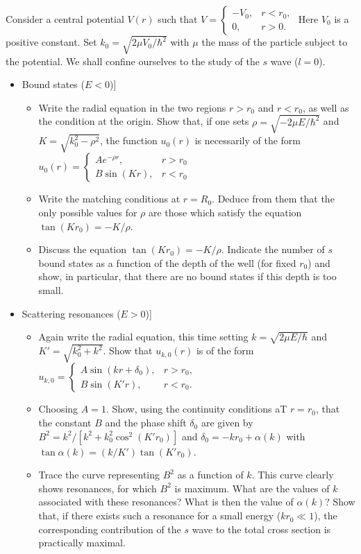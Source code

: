 \documentclass[10pt,a4paper]{article}
\newenvironment{problem}[2][Problem]{\begin{trivlist}
\item[\hskip \labelsep {\bfseries #1}\hskip \labelsep {\bfseries #2.}]}{\end{trivlist}}
\begin{document}
\begin{problem}{4}
[C-T Complement C$_\text{VIII}$-3 Exercise b] Consider a central potential $V(r)$ such that $V=\left\{\begin{array}{ll}-V_0,&r<r_0,\\0,&r>0.\end{array}\right.$ Here $V_0$ is a positive constant. Set $k_0=\sqrt{2\mu V_0/\hbar^2}$ with $\mu$ the mass of the particle subject to the potential. We shall confine ourselves to the study of the $s$ wave ($l=0$).
\begin{itemize}
\item[(a)] Bound states ($E<0$)]
\begin{itemize}
\item[i.] Write the radial equation in the two regions $r>r_0$ and $r<r_0$, as well as the condition at the origin. Show that, if one sets $\rho=\sqrt{-2\mu E/\hbar^2}$ and $K=\sqrt{k_0^2-\rho^2}$, the function $u_0(r)$ is necessarily of the form $u_0(r)=\left\{\begin{array}{ll}Ae^{-\rho r},&r>r_0\\B\sin(Kr),&r<r_0\end{array}\right.$
\item[ii.] Write the matching conditions at $r=R_0$. Deduce from them that the only possible values for $\rho$ are those which satisfy the equation $\tan(Kr_0)=-K/\rho$.
\item[iii.] Discuss the equation $\tan(Kr_0)=-K/\rho$. Indicate the number of $s$ bound states as a function of the depth of the well (for fixed $r_0$) and show, in particular, that there are no bound states if this depth is too small. 
\end{itemize}
\item[(b)] Scattering resonances ($E>0$)]
\begin{itemize}
\item[i.] Again write the radial equation, this time setting $k=\sqrt{2\mu E/\hbar}$ and $K'=\sqrt{k_0^2+k^2}$. Show that $u_{k,0}(r)$ is of the form $u_{k,0}=\left\{\begin{array}{ll}A\sin(kr+\delta_0),&r>r_0,\\B\sin(K'r),&r<r_0.\end{array}\right.$
\item[ii.] Choosing $A=1$. Show, using the continuity conditions aT $r=r_0$, that the constant $B$ and the phase shift $\delta_0$ are given by $B^2=k^2/[k^2+k_0^2\cos^2(K'r_0)]$ and $\delta_0=-kr_0+\alpha(k)$ with $\tan\alpha(k)=(k/K')\tan(K'r_0)$.
\item[iii.] Trace the curve representing $B^2$ as a function of $k$. This curve clearly shows resonances, for which $B^2$ is maximum. What are the values of $k$ associated with these resonances? What is then the value of $\alpha(k)$? Show that, if there exists such a resonance for a small energy ($kr_0\ll1$), the corresponding contribution of the $s$ wave to the total cross section is practically maximal.

\end{itemize}
\end{itemize}
\end{problem}
\end{document}
